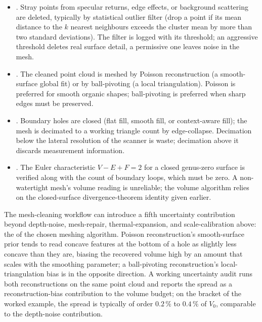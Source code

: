 \begin{itemize}[leftmargin=*]
  \item {}. Stray points from
    specular returns, edge effects, or background scattering are
    deleted, typically by statistical outlier filter (drop a point
    if its mean distance to the $k$ nearest neighbours exceeds the
    cluster mean by more than two standard deviations). The filter
    is logged with its threshold; an aggressive threshold deletes
    real surface detail, a permissive one leaves noise in the mesh.
  \item {}. The cleaned point cloud
    is meshed by Poisson reconstruction (a smooth-surface global
    fit) or by ball-pivoting (a local triangulation). Poisson is
    preferred for smooth organic shapes; ball-pivoting is preferred
    when sharp edges must be preserved.
  \item {}. Boundary holes are
    closed (flat fill, smooth fill, or context-aware fill); the
    mesh is decimated to a working triangle count by edge-collapse.
    Decimation below the lateral resolution of the scanner is
    waste; decimation above it discards measurement information.
  \item {}. The Euler characteristic
    $V - E + F = 2$ for a closed genus-zero surface is verified
    along with the count of boundary loops, which must be zero. A
    non-watertight mesh's volume reading is unreliable; the volume
    algorithm relies on the closed-surface divergence-theorem
    identity given earlier.
\end{itemize}

The mesh-cleaning workflow can introduce a fifth uncertainty
contribution beyond depth-noise, mesh-repair, thermal-expansion, and
scale-calibration above: the  of the
chosen meshing algorithm. Poisson reconstruction's smooth-surface
prior tends to read concave features at the bottom of a hole as
slightly less concave than they are, biasing the recovered volume
high by an amount that scales with the smoothing parameter; a
ball-pivoting reconstruction's local-triangulation bias is in the
opposite direction. A working uncertainty audit runs both
reconstructions on the same point cloud and reports the spread as a
reconstruction-bias contribution to the volume budget; on
the bracket of the worked example, the spread is typically of order
$0.2\,\%$ to $0.4\,\%$ of $V_{0}$, comparable to the depth-noise
contribution.

